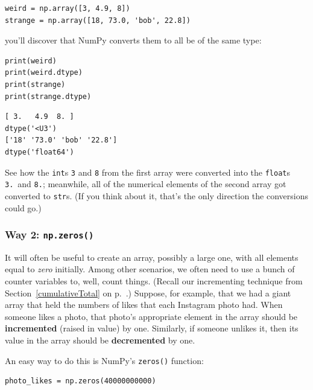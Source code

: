 \begin{Verbatim}[fontsize=\small,samepage=true,frame=single,framesep=3mm]
weird = np.array([3, 4.9, 8])
strange = np.array([18, 73.0, 'bob', 22.8])
\end{Verbatim}

you'll discover that NumPy converts them to all be of the same type:

\begin{Verbatim}[fontsize=\small,samepage=true,frame=single,framesep=3mm]
print(weird)
print(weird.dtype)
print(strange)
print(strange.dtype)
\end{Verbatim}

\begin{Verbatim}[fontsize=\small,samepage=true,frame=leftline,framesep=5mm,framerule=1mm]
[ 3.   4.9  8. ]
dtype('<U3')
['18' '73.0' 'bob' '22.8']
dtype('float64')
\end{Verbatim}

See how the \texttt{int}s \texttt{3} and \texttt{8} from the first array were
converted into the \texttt{float}s \texttt{3.}~and \texttt{8.}; meanwhile, all
of the numerical elements of the second array got converted to \texttt{str}s.
(If you think about it, that's the only direction the conversions could go.)

\subsubsection{Way 2: \texttt{np.zeros()}}


It will often be useful to create an array, possibly a large one, with all
elements equal to \textit{zero} initially. Among other scenarios, we often need
to use a bunch of counter variables to, well, count things. (Recall our
incrementing technique from Section~\ref{cumulativeTotal} on
p.~\pageref{cumulativeTotal}.) Suppose, for example, that we had a giant array
that held the numbers of likes that each Instagram photo had. When someone
likes a photo, that photo's appropriate element in the array should be
\textbf{incremented} (raised in value) by one. Similarly, if someone unlikes
it, then its value in the array should be \textbf{decremented} by one.

An easy way to do this is NumPy's \texttt{zeros()} function:

\begin{Verbatim}[fontsize=\small,samepage=true,frame=single,framesep=3mm]
photo_likes = np.zeros(40000000000)
\end{Verbatim}

